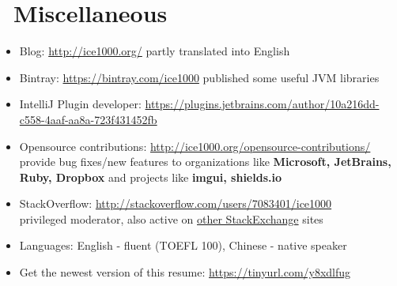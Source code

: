 \documentclass{style/resume2}
\begin{document}
\section{\faInfo\ Miscellaneous}
\begin{itemize}[parsep=0.5ex]
  \item Blog: \url{http://ice1000.org/} partly translated into English
  \item Bintray: \url{https://bintray.com/ice1000} published some useful JVM libraries
  \item IntelliJ Plugin developer: \url{https://plugins.jetbrains.com/author/10a216dd-c558-4aaf-aa8a-723f431452fb}
  \item Opensource contributions: \url{http://ice1000.org/opensource-contributions/} \\
    provide bug fixes/new features to organizations like \textbf{Microsoft, JetBrains, Ruby, Dropbox}
    and projects like \textbf{imgui, shields.io}
  \item StackOverflow: \url{http://stackoverflow.com/users/7083401/ice1000} \\
    privileged moderator, also active on \href{https://stackexchange.com/users/9532102/ice1000} {other StackExchange} sites
  \item Languages: English - fluent (TOEFL 100), Chinese - native speaker
  \item Get the newest version of this resume: \url{https://tinyurl.com/y8xdlfug}
\end{itemize}

%
%
\end{document}
